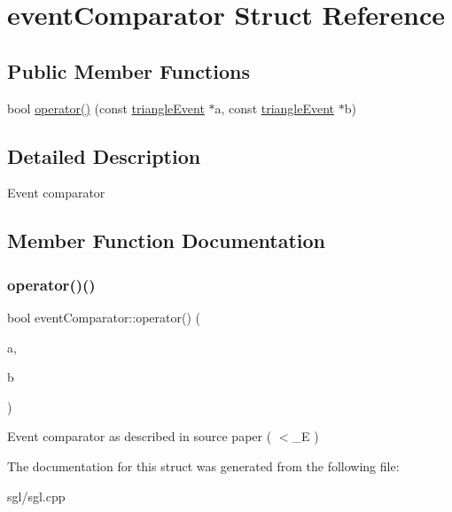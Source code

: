 \hypertarget{structevent_comparator}{}\section{event\+Comparator Struct Reference}
\label{structevent_comparator}
\subsection*{Public Member Functions}
\begin{DoxyCompactItemize}
\item 
bool \hyperlink{structevent_comparator_a89a5486e6d21a0cdca230fc9c25c7bff}{operator()} (const \hyperlink{classtriangle_event}{triangle\+Event} $\ast$a, const \hyperlink{classtriangle_event}{triangle\+Event} $\ast$b)
\end{DoxyCompactItemize}


\subsection{Detailed Description}
Event comparator 

\subsection{Member Function Documentation}
\mbox{\label{structevent_comparator_a89a5486e6d21a0cdca230fc9c25c7bff}} 
\subsubsection{\texorpdfstring{operator()()}{operator()()}}
{\footnotesize\ttfamily bool event\+Comparator\+::operator() (\begin{DoxyParamCaption}\item[{const \hyperlink{classtriangle_event}{triangle\+Event} $\ast$}]{a,  }\item[{const \hyperlink{classtriangle_event}{triangle\+Event} $\ast$}]{b }\end{DoxyParamCaption})\hspace{0.3cm}{\ttfamily [inline]}}

Event comparator as described in source paper ( $<$\+\_\+E ) 

The documentation for this struct was generated from the following file\+:\begin{DoxyCompactItemize}
\item 
sgl/sgl.\+cpp\end{DoxyCompactItemize}
